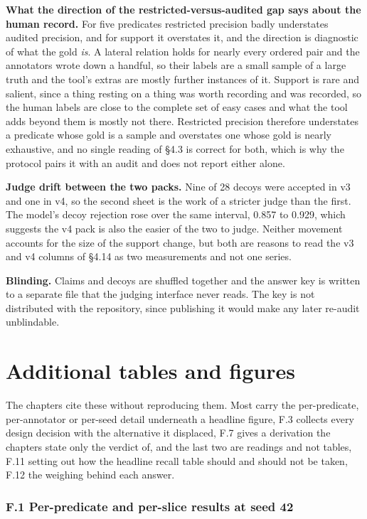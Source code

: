 \textbf{What the direction of the restricted-versus-audited gap says about the human record.} For five predicates restricted precision badly understates audited precision, and for support it overstates it, and the direction is diagnostic of what the gold \textit{is}. A lateral relation holds for nearly every ordered pair and the annotators wrote down a handful, so their labels are a small sample of a large truth and the tool's extras are mostly further instances of it. Support is rare and salient, since a thing resting on a thing was worth recording and was recorded, so the human labels are close to the complete set of easy cases and what the tool adds beyond them is mostly not there. Restricted precision therefore understates a predicate whose gold is a sample and overstates one whose gold is nearly exhaustive, and no single reading of \S{}4.3 is correct for both, which is why the protocol pairs it with an audit and does not report either alone.

\textbf{Judge drift between the two packs.} Nine of 28 decoys were accepted in v3 and one in v4, so the second sheet is the work of a stricter judge than the first. The model's decoy rejection rose over the same interval, 0.857 to 0.929, which suggests the v4 pack is also the easier of the two to judge. Neither movement accounts for the size of the support change, but both are reasons to read the v3 and v4 columns of \S{}4.14 as two measurements and not one series.

\textbf{Blinding.} Claims and decoys are shuffled together and the answer key is written to a separate file that the judging interface never reads. The key is not distributed with the repository, since publishing it would make any later re-audit unblindable.


\chapter{Additional tables and figures}


The chapters cite these without reproducing them. Most carry the per-predicate, per-annotator or per-seed detail underneath a headline figure, F.3 collects every design decision with the alternative it displaced, F.7 gives a derivation the chapters state only the verdict of, and the last two are readings and not tables, F.11 setting out how the headline recall table should and should not be taken, F.12 the weighing behind each answer.

\subsection{F.1 Per-predicate and per-slice results at seed 42}

